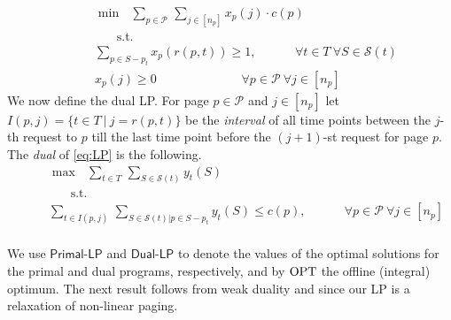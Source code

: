 \documentclass[11pt]{article}
\newcommand{\cC}{{\mathcal{C}}}
\newcommand{\cP}{{\mathcal{P}}}
\newcommand{\cS}{{\mathcal{S}}}
\newcommand{\OPT}{\textnormal{OPT}}
\newcommand{\om}{{\Omega}}
\newcommand{\bbc}{{\bar{\cC}(I_t)}}
\begin{document}
\begin{equation}
	\label{eq:LP}
	\begin{aligned}
  ~~~~~~~~	& \min~~~ \sum_{p \in \cP~} \sum_{j \in [n_p]}  x_p(j) \cdot c(p)\\
		& ~~~~~~~~\text{s.t. }\\
		& \sum_{p \in S-p_t} x_p(r(p,t)) \geq 1, 	~~~~~~~~~~~~~~\forall t \in T~\forall S  \in \cS(t) \\ 
		& x_p(j) \geq 0 ~~~~~~~~~~~~~~~~~~~~~~~~~~~~~~~	\forall p \in \cP~\forall j \in [n_p]
	\end{aligned}
\end{equation} 
We now define the dual LP. For page $p \in \cP$ and $j \in [n_p]$ let $I(p,j) = \{t \in T~|~j = r(p,t)\}$ be the {\em interval} of all time points between the $j$-th request to $p$ till the last time point before the $(j+1)$-st request for page $p$. %
The {\em dual} of \eqref{eq:LP} is the following. 
\begin{equation}
	\label{eq:dualD}
	\begin{aligned}
  ~~~~~~~~	& \max~~~ \sum_{t \in T~} \sum_{S  \in \cS(t)} y_t(S)\\
		& ~~~~~~~~\text{s.t. }\\
		& \sum_{t \in I(p,j)~} \sum_{S \in \cS(t)\big|p \in S-p_t} y_t(S) \leq c(p), 	~~~~~~~~~~~~~~\forall p \in \cP~\forall j \in [n_p]\\ 
	\end{aligned}
\end{equation} 


We use $\textsf{Primal-LP}$ and $\textsf{Dual-LP}$ to denote the values of the optimal solutions for the primal and dual programs, respectively, and by $\OPT$ the offline (integral) optimum.  
The next result follows from weak duality and since our LP is a relaxation of non-linear paging.
  
\end{document}

